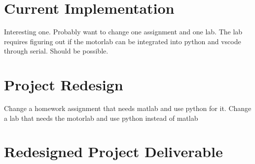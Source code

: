 \section{Current Implementation}
Interesting one. Probably want to change one assignment and one lab. 
The lab requires figuring out if the motorlab can be integrated into 
python and vscode through serial. Should be possible.

\section{Project Redesign}
Change a homework assignment that needs matlab and use python for it. 
Change a lab that needs the motorlab and use python instead of matlab

\section{Redesigned Project Deliverable}
